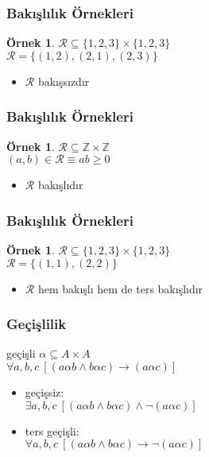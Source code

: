 \documentclass[dvipsnames]{beamer}
\theoremstyle{definition}
\theoremstyle{example}
\newtheorem{ornek}[theorem]{Örnek}
\theoremstyle{plain}
\begin{document}
\begin{frame}
  \frametitle{Bakışlılık Örnekleri}

  \begin{ornek}
    $\mathcal{R} \subseteq \{1,2,3\} \times \{1,2,3\}$\\
    $\mathcal{R} = \{(1,2), (2,1), (2,3)\}$

    \pause
    \medskip
    \begin{itemize}
      \item $\mathcal{R}$ bakışsızdır
    \end{itemize}
  \end{ornek}
\end{frame}

\begin{frame}
  \frametitle{Bakışlılık Örnekleri}

  \begin{ornek}
    $\mathcal{R} \subseteq \mathbb{Z} \times \mathbb{Z}$\\
    $(a,b) \in \mathcal{R} \equiv ab \geq 0$

    \medskip
    \begin{itemize}
      \item $\mathcal{R}$ bakışlıdır
    \end{itemize}
  \end{ornek}
\end{frame}

\begin{frame}
  \frametitle{Bakışlılık Örnekleri}

  \begin{ornek}
    $\mathcal{R} \subseteq \{1,2,3\} \times \{1,2,3\}$\\
    $\mathcal{R} = \{(1,1), (2,2)\}$

    \begin{itemize}
      \item $\mathcal{R}$ hem bakışlı hem de ters bakışlıdır
    \end{itemize}
  \end{ornek}
\end{frame}

\begin{frame}
  \frametitle{Geçişlilik}

  \begin{block}{geçişli}
    $\alpha \subseteq A \times A$\\
    $\forall a,b,c~[(a \alpha b \wedge b \alpha c) \rightarrow (a \alpha c)]$
  \end{block}

  \pause
  \begin{itemize}
    \item geçişsiz:\\
      $\exists a,b,c~[(a \alpha b \wedge b \alpha c) \wedge \neg (a \alpha c)]$

    \pause
    \item ters geçişli:\\
      $\forall a,b,c~[(a \alpha b \wedge b \alpha c) \rightarrow \neg (a \alpha c)]$
  \end{itemize}
\end{frame}
\end{document}
